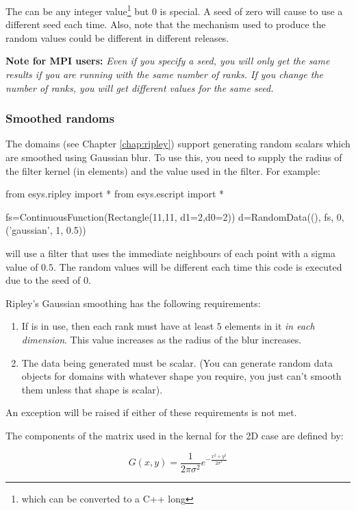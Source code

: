 The  can be any integer value\footnote{which can be converted to a
C++ long} but 0 is special.
A seed of zero will cause \escript to use a different seed each time.
Also, note that the mechanism used to produce the random values could be
different in different releases.

\noindent\textbf{Note for MPI users:}
\textsl{
Even if you specify a seed, you will only get the same results if you are running with the same
number of ranks.
If you change the number of ranks, you will get different values for the same seed.
}

\subsubsection{Smoothed randoms}
The \ripley domains (see Chapter \ref{chap:ripley}) support generating random
scalars which are smoothed using Gaussian blur.
To use this, you need to supply the radius of the filter kernel (in elements)
and the  value used in the filter.
For example:
\begin{python}
from esys.ripley import *
from esys.escript import *

fs=ContinuousFunction(Rectangle(11,11, d1=2,d0=2))
d=RandomData((), fs, 0, ('gaussian', 1, 0.5))
\end{python}
will use a filter that uses the immediate neighbours of each point with a sigma
value of $0.5$.
The random values will be different each time this code is executed due to the
seed of $0$.

Ripley's Gaussian smoothing has the following requirements:
\begin{enumerate}
    \item If \MPI is in use, then each rank must have at least $5$ elements in
          it \emph{in each dimension}. This value increases as the radius of
          the blur increases.
    \item The data being generated must be scalar. (You can generate random
          data objects for \ripley domains with whatever shape you require, you
          just can't smooth them unless that shape is scalar).
\end{enumerate}
An exception will be raised if either of these requirements is not met. 

The components of the matrix used in the kernal for the 2D case are
defined\cite{gaussfilter} by:

\[ G(x,y) = \frac{1}{2\pi\sigma^2} e^{-\frac{x^2+y^2}{2\sigma^2}} \]

